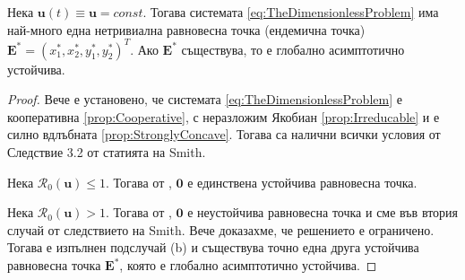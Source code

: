 \begin{proposition}
  Нека $\mathbf{u}(t)\equiv \mathbf{u}=const$.
  Тогава системата \eqref{eq:TheDimensionlessProblem} има най-много една нетривиална равновесна точка (ендемична точка) $\mathbf{E}^*=(x_1^*, x_2^*, y_1^*, y_2^*)^T$.
  Ако $\mathbf{E}^*$ съществува, то е глобално асимптотично устойчива.
\end{proposition}

\begin{proof}
  Вече е установено, че системата \eqref{eq:TheDimensionlessProblem} е кооперативна \eqref{prop:Cooperative}, с неразложим Якобиан \eqref{prop:Irreducable} и е силно вдлъбната \eqref{prop:StronglyConcave}. Тогава са налични всички условия от Следствие 3.2 от статията \cite{Smith1986} на Smith.

  Нека $\mathscr{R}_0(\mathbf{u}) \leq 1$. Тогава от \cite{Driessche2002}, $\mathbf{0}$ е единствена устойчива равновесна точка.

  Нека $\mathscr{R}_0(\mathbf{u}) > 1$. Тогава от \cite{Driessche2002}, $\mathbf{0}$ е неустойчива равновесна точка и сме във втория случай от следствието на Smith. Вече доказахме, че решението е ограничено. Тогава е изпълнен подслучай (b) и съществува точно една друга устойчива равновесна точка $\mathbf{E}^*$, която е глобално асимптотично устойчива.
\end{proof}

